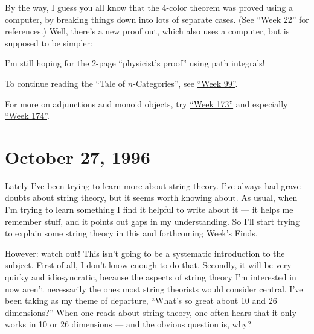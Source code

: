 \documentclass{article}
\def\tightlist{}
\renewcommand{\texttt}[1]{%
  \begingroup
  \ttfamily
  \begingroup\lccode`~=`/\lowercase{\endgroup\def~}{/\discretionary{}{}{}}%
  \begingroup\lccode`~=`[\lowercase{\endgroup\def~}{[\discretionary{}{}{}}%
  \begingroup\lccode`~=`.\lowercase{\endgroup\def~}{.\discretionary{}{}{}}%
  \catcode`/=\active\catcode`[=\active\catcode`.=\active
  \scantokens{#1\noexpand}%
  \endgroup
}
\begin{document}
By the way, I guess you all know that the 4-color theorem was proved
using a computer, by breaking things down into lots of separate cases.
(See \protect\hyperlink{week22}{``Week 22''} for references.) Well,
there's a new proof out, which also uses a computer, but is supposed to
be simpler:


I'm still hoping for the 2-page ``physicist's proof'' using path
integrals!

To continue reading the ``Tale of \(n\)-Categories'', see
\protect\hyperlink{week99}{``Week 99''}.

For more on adjunctions and monoid objects, try
\protect\hyperlink{week173}{``Week 173''} and especially
\protect\hyperlink{week174}{``Week 174''}.



\hypertarget{week93}{%
\section{October 27, 1996}\label{week93}}

Lately I've been trying to learn more about string theory. I've always
had grave doubts about string theory, but it seems worth knowing about.
As usual, when I'm trying to learn something I find it helpful to write
about it --- it helps me remember stuff, and it points out gaps in my
understanding. So I'll start trying to explain some string theory in
this and forthcoming Week's Finds.

However: watch out! This isn't going to be a systematic introduction to
the subject. First of all, I don't know enough to do that. Secondly, it
will be very quirky and idiosyncratic, because the aspects of string
theory I'm interested in now aren't necessarily the ones most string
theorists would consider central. I've been taking as my theme of
departure, ``What's so great about 10 and 26 dimensions?'' When one
reads about string theory, one often hears that it only works in 10 or
26 dimensions --- and the obvious question is, why?
\end{document}
